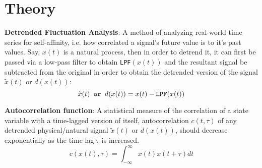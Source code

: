 \section[Theory]{Theory}
\label{sec:theory}

\textbf{Detrended Fluctuation Analysis}: A method of analyzing real-world time series for self-affinity, i.e. how correlated a signal's future value is to it's past values. Say, $x(t)$ is a natural process, then in order to detrend it, it can first be passed via a low-pass filter to obtain \verb|LPF|$(x(t))$ and the resultant signal be subtracted from the original in order to obtain the detrended version of the signal $\tilde{x}(t)$ or $d(x(t))$:
\begin{equation}
	\tilde{x}(t) \verb| or | d(x(t)) = x(t) - \verb|LPF|(x(t))
\end{equation}

\textbf{Autocorrelation function}: A statistical measure of the correlation of a state variable with a time-lagged version of itself, autocorrelation $c(t, \tau)$ of any detrended physical/natural signal $\tilde{x}(t)$ or $d(x(t))$, should decrease exponentially as the time-lag $\tau$ is increased.
\begin{equation}
	c(x(t), \tau) = \int_{-\infty}^{\infty}x(t)x(t+\tau)dt  
\end{equation}

